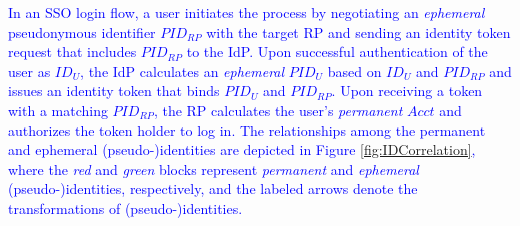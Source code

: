 \textcolor{blue}{In an SSO login flow,
a user initiates the process by negotiating an \emph{ephemeral} pseudonymous identifier $PID_{RP}$  with the target RP and sending an identity token request that includes $PID_{RP}$ to the IdP. 
Upon successful authentication of the user as $ID_U$, the IdP calculates an \emph{ephemeral} $PID_U$ based on $ID_U$ and $PID_{RP}$ and issues an identity token that binds $PID_U$ and $PID_{RP}$. Upon receiving a token with a matching $PID_{RP}$, the RP calculates the user's \emph{permanent} $Acct$ and authorizes the token holder to log in.
%
The relationships among the permanent and ephemeral (pseudo-)identities are depicted in Figure \ref{fig:IDCorrelation}, where the \emph{red} and \emph{green} blocks represent \emph{permanent} and \emph{ephemeral} (pseudo-)identities, respectively, and
the labeled arrows denote the transformations of (pseudo-)identities.}


